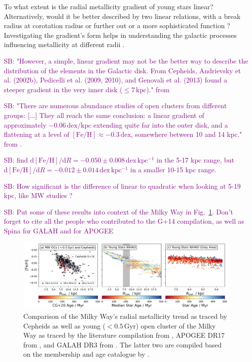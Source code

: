 \documentclass[fleqn,usenatbib]{mnras}
\newcommand{\SB}[1]{{\textcolor{purple}{SB: #1}}}
\newcommand{\nihaoAGEmax}{$0.5\,\mathrm{Gyr}$}
\begin{document}
To what extent is the radial metallicity gradient of young stars linear? Alternatively, would it be better described by two linear relations, with a break radius at corotation radius \citep[][and references therein]{Bresolin2012} or further out \citep{Donor2020} or a more sophisticated function \citep[see e.g.][]{Chiappini2001, Kubryk2015}? Investigating the gradient's form helps in understanding the galactic processes influencing metallicity at different radii \citep{Minchev2014b}.

\SB{"However, a simple, linear gradient may not be the better way to describe the distribution of the elements in the Galactic disk. From Cepheids, Andrievsky et al. (2002b), Pedicelli et al. (2009, 2010), and Genovali et al. (2013) found a steeper gradient in the very inner disk ($\leq 7\,\mathrm{kpc}$)." from \citet{Lemasle2013}}

\SB{"There are numerous abundance studies of open clusters from different groups: [...] They all reach the same conclusion: a linear gradient of approximately $-0.06\,\mathrm{dex/kpc}$ extending quite far into the outer disk, and a flattening at a level of $\mathrm{[Fe/H]} \approx -0.3\,\mathrm{dex}$, somewhere between 10 and 14 kpc." from \citet{Lemasle2013}.}

\SB{\citet{Lemasle2008} find $\mathrm{d[Fe/H]}/\mathrm{d}R = -0.050 \pm 0.008\,\mathrm{dex\,kpc^{-1}}$ in the 5-17 kpc range, but $\mathrm{d[Fe/H]}/\mathrm{d}R = -0.012 \pm 0.014\,\mathrm{dex\,kpc^{-1}}$ in a smaller 10-15 kpc range.}

\SB{How significant is the difference of linear to quadratic when looking at 5-19 kpc, like MW studies \citep{Genovali2014}?}

\SB{Put some of these results into context of the Milky Way in Fig.~\ref{fig:radial_metallicity_gradients_mw_vs_nihao}. Don't forget to cite all the people who contributed to the G+14 compilation, as well as Spina for GALAH and \citet{Myers2022, Donor2020} for APOGEE}

\begin{figure}
    \centering
    \includegraphics[width=\textwidth]{figures/radial_metallicity_gradients_mw_vs_nihao.png}
    \caption{Comparison of the Milky Way's radial metallicity trend as traced by Cepheids \citep[black triangles, compiled from literature by][G+14]{Genovali2014} as well as young ($<$\nihaoAGEmax) open cluster of the Milky Way as traced by the literature compilation from \citet[][G+14 as squares]{Genovali2014}, APOGEE DR17 from \citet[][M+22 as crosses]{Myers2022}, and GALAH DR3 from \citet[][S+21 as circles]{Spina2021}. The latter two are compiled based on the membership and age catalogue by \citet[][CG+20]{CantatGaudin2020}.
    }
    \label{fig:radial_metallicity_gradients_mw_vs_nihao}
\end{figure}
\end{document}
